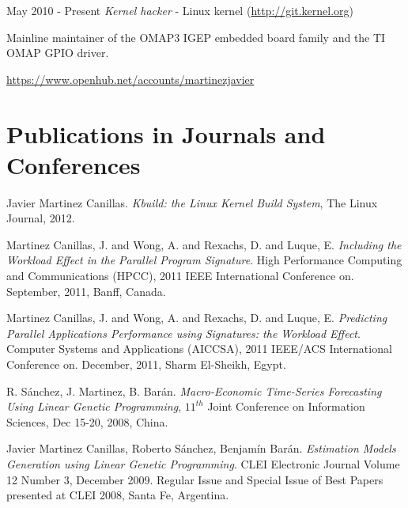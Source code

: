 \documentclass{simplecv}
\begin{document}
\begin{topic}

\item[May 2010 - Present] \emph{Kernel hacker} - Linux kernel (\url{http://git.kernel.org})

Mainline maintainer of the OMAP3 IGEP embedded board family and the TI OMAP GPIO driver.

\url{https://www.openhub.net/accounts/martinezjavier}

\end{topic}

\section{Publications in Journals and Conferences}

\begin{thebibliography}{10}

\footnotesize

Javier Martinez Canillas. \emph{Kbuild: the Linux Kernel Build System}, The Linux Journal, 2012. 

Martinez Canillas, J. and Wong, A. and Rexachs, D. and Luque, E. \emph{Including the Workload Effect in the Parallel Program Signature}. High Performance Computing and Communications (HPCC), 2011 IEEE International Conference on. September, 2011, Banff, Canada.

Martinez Canillas, J. and Wong, A. and Rexachs, D. and Luque, E. \emph{Predicting Parallel Applications Performance using Signatures: the Workload Effect}. Computer Systems and Applications (AICCSA), 2011 IEEE/ACS International Conference on. December, 2011, Sharm El-Sheikh, Egypt.

R. Sánchez, J. Martinez, B. Barán. \emph{Macro-Economic Time-Series Forecasting Using Linear Genetic Programming}, $11^{th}$ Joint Conference on Information Sciences, Dec 15-20, 2008, China. 

Javier Martinez Canillas, Roberto Sánchez, Benjamín Barán. \emph{Estimation Models Generation using Linear Genetic Programming}. CLEI Electronic Journal Volume 12 Number 3, December 2009. Regular Issue and Special Issue of Best Papers presented at CLEI 2008, Santa Fe, Argentina.

\end{thebibliography}
\end{document}
